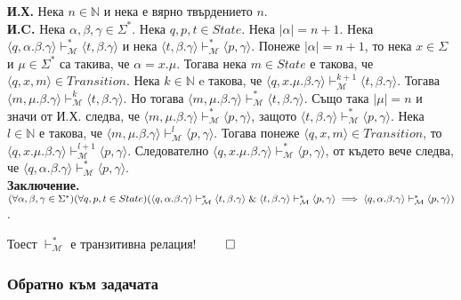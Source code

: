 \documentclass[12pt]{article}
\begin{document}
\textbf{И.Х.}
Нека \(n \in \mathbb N\) и нека е вярно твърдението \(n\). \\

\textbf{И.C.}
Нека \(\alpha, \beta, \gamma \in \Sigma^*\). Нека \(q, p, t \in State\). Нека \(|\alpha| = n + 1\).
Нека \(\langle q, \alpha.\beta.\gamma \rangle \vdash_{\mathcal M}^* \langle t, \beta.\gamma \rangle\)
и нека \(\langle t, \beta.\gamma \rangle \vdash_{\mathcal M}^* \langle p, \gamma \rangle\).
Понеже \(|\alpha| = n + 1\), то нека \(x \in \Sigma\) и \(\mu \in \Sigma^*\) са такива, че
\(\alpha = x.\mu\). Тогава нека \(m \in State\) е такова, че
\( \langle q, x, m \rangle \in Transition \). Нека \(k \in \mathbb N\) e такова, че
\(\langle q, x.\mu.\beta.\gamma \rangle \vdash_{\mathcal M}^{k + 1} \langle t, \beta.\gamma \rangle\).
Тогава \(\langle m, \mu.\beta.\gamma \rangle \vdash_{\mathcal M}^k \langle t, \beta.\gamma \rangle\).
Но тогава \(\langle m, \mu.\beta.\gamma \rangle \vdash_{\mathcal M}^* \langle t, \beta.\gamma \rangle\).
Също така \(|\mu| = n\) и значи от И.Х. следва, че
\(\langle m, \mu.\beta.\gamma \rangle \vdash_{\mathcal M}^* \langle p, \gamma \rangle\), защото
\(\langle t, \beta.\gamma \rangle \vdash_{\mathcal M}^* \langle p, \gamma \rangle\).
Нека \(l \in \mathbb N\) е такова, че \(\langle m, \mu.\beta.\gamma \rangle \vdash_{\mathcal M}^l \langle p, \gamma \rangle\). Тогава понеже \( \langle q, x, m \rangle \in Transition \), то
\(\langle q, x.\mu.\beta.\gamma \rangle \vdash_{\mathcal M}^{l + 1} \langle p, \gamma \rangle\).
Следователно \(\langle q, x.\mu.\beta.\gamma \rangle \vdash_{\mathcal M}^* \langle p, \gamma \rangle\),
от където вече следва, че \(\langle q, \alpha.\beta.\gamma \rangle \vdash_{\mathcal M}^* \langle p, \gamma \rangle\). \\

\textbf{Заключение.}
\((\forall \alpha, \beta, \gamma \in \Sigma^*)(\forall q, p, t \in State)\\
(\langle q, \alpha.\beta.\gamma \rangle \vdash_{\mathcal M}^* \langle t, \beta.\gamma \rangle \;\&\; \langle t, \beta.\gamma \rangle \vdash_{\mathcal M}^* \langle p, \gamma \rangle \implies \langle q, \alpha.\beta.\gamma \rangle \vdash_{\mathcal M}^* \langle p, \gamma \rangle )\).

Тоест \(\vdash_{\mathcal M}^*\) е транзитивна релация! \(\qed\)

\subsubsection*{Обратно към задачата}
\end{document}
